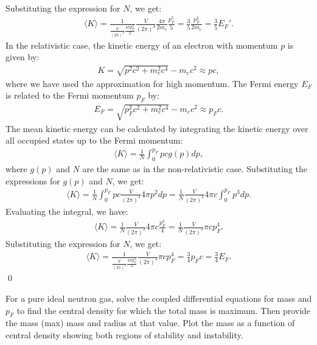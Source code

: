 Substituting the expression for $N$, we get:
\begin{align}
    \langle K \rangle = \frac{1}{\frac{V}{(2\pi)^3} \frac{4\pi p_F^3}{3}} \frac{V}{(2\pi)^3} \frac{4\pi}{2m_e} \frac{p_F^5}{5} = \frac{3}{5} \frac{p_F^2}{2m_e} = \frac{3}{5} E_F'.
\end{align}
In the relativistic case, the kinetic energy of an electron with momentum $p$ is given by:
\begin{align}
    K = \sqrt{p^2 c^2 + m_e^2 c^4} - m_e c^2\approx pc,
\end{align}
where we have used the approximation for high momentum. The Fermi energy $E_F$ is related to the Fermi momentum $p_F$ by:
\begin{align}
    E_F = \sqrt{p_F^2 c^2 + m_e^2 c^4} - m_e c^2 \approx p_F c.
\end{align}
The mean kinetic energy can be calculated by integrating the kinetic energy over all occupied states up to the Fermi momentum:
\begin{align}
    \langle K \rangle = \frac{1}{N} \int_0^{p_F} pc g(p) dp,
\end{align}where $g(p)$ and $N$ are the same as in the non-relativistic case. Substituting the expressions for $g(p)$ and $N$, we get:
\begin{align}
    \langle K \rangle = \frac{1}{N} \int_0^{p_F} pc \frac{V}{(2\pi)^3} 4\pi p^2 dp = \frac{1}{N} \frac{V}{(2\pi)^3} 4\pi c \int_0^{p_F} p^3 dp.
\end{align}
Evaluating the integral, we have:
\begin{align}
    \langle K \rangle = \frac{1}{N} \frac{V}{(2\pi)^3} 4\pi c \frac{p_F^4}{4} = \frac{1}{N} \frac{V}{(2\pi)^3} \pi c p_F^4.
\end{align}Substituting the expression for $N$, we get:
\begin{align}
    \langle K \rangle = \frac{1}{\frac{V}{(2\pi)^3} \frac{4\pi p_F^3}{3}} \frac{V}{(2\pi)^3} \pi c p_F^4 = \frac{3}{4} p_F c = \frac{3}{4} E_F.
\end{align}\qed







\clearpage
{}
For a pure ideal neutron gas, solve the coupled differential equations for mass and $p_F$ to find the central density for which the total mass is maximum. Then provide the mass (max) mass and radius at that value. Plot the mass as a function of central density showing both regions of stability and instability. 

